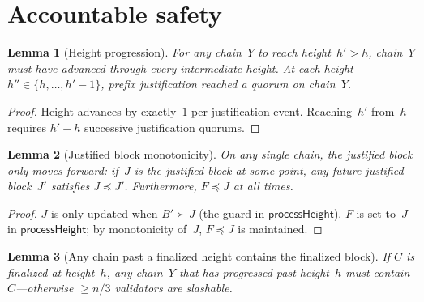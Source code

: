 \documentclass{article}
\theoremstyle{plain}
\newtheorem{lemma}{Lemma}
\theoremstyle{definition}
\theoremstyle{remark}
\begin{document}
\section{Accountable safety}

\begin{lemma}[Height progression]\label{lem:heightprog}
For any chain~$Y$ to reach height~$h' > h$, chain~$Y$ must have advanced through every intermediate height.
At each height $h'' \in \{h, \ldots, h'-1\}$, prefix justification reached a quorum on chain~$Y$.
\end{lemma}

\begin{proof}
Height advances by exactly~$1$ per justification event.
Reaching~$h'$ from~$h$ requires $h' - h$ successive justification quorums.
\end{proof}

\begin{lemma}[Justified block monotonicity]\label{lem:slotmono}
On any single chain, the justified block only moves forward: if~$J$ is the justified block at some point, any future justified block~$J'$ satisfies $J \preceq J'$.
Furthermore, $F \preceq J$ at all times.
\end{lemma}

\begin{proof}
$J$ is only updated when $B' \succ J$ (the guard in $\textsf{processHeight}$).
$F$ is set to~$J$ in $\textsf{processHeight}$; by monotonicity of~$J$, $F \preceq J$ is maintained.
\end{proof}

\begin{lemma}[Any chain past a finalized height contains the finalized block]\label{lem:mainsafety}
If $C$ is finalized at height~$h$, any chain~$Y$ that has progressed past height~$h$ must contain~$C$---otherwise $\geq n/3$ validators are slashable.
\end{lemma}
\end{document}
